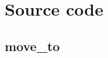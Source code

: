 \documentclass[\rootfolder/main.tex]{subfiles}
\begin{document}
\label{app:sourcecode} %

\chapter{Source code}

\section{move\_to}
\label{app:moveto}

\inputminted[fontsize=\scriptsize]{python}{\rootfolder/Appendices/Listings/move_to.py}

\section{}
\end{document}
